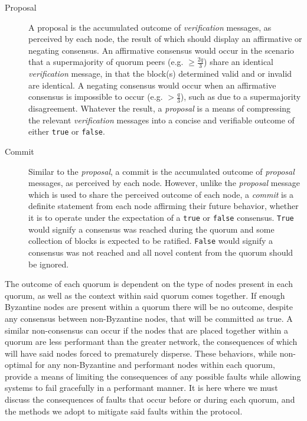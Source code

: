 \begin{description}
    \item[Proposal] A proposal is the accumulated outcome of \textit{verification} messages, as perceived by each node, the result of which should display an affirmative or negating consensus. An affirmative consensus would occur in the scenario that a supermajority of quorum peers (e.g. \(\ge \frac{2q}{3}\)) share an identical \textit{verification} message, in that the block(s) determined valid and or invalid are identical. A negating consensus would occur when an affirmative consensus is impossible  to occur (e.g. \(> \frac{q}{3}\)), such as due to a supermajority disagreement. Whatever the result, a \textit{proposal} is a means of compressing the relevant \textit{verification} messages into a concise and verifiable outcome of either \texttt{true} or \texttt{false}.

    \item[Commit] Similar to the \textit{proposal}, a commit is the accumulated outcome of \textit{proposal} messages, as perceived by each node. However, unlike the \textit{proposal} message which is used to share the perceived outcome of each node, a \textit{commit} is a definite statement from each node affirming their future behavior, whether it is to operate under the expectation of a \texttt{true} or \texttt{false} consensus. \texttt{True} would signify a consensus was reached during the quorum and some collection of blocks is expected to be ratified. \texttt{False} would signify a consensus was not reached and all novel content from the quorum should be ignored.
\end{description}

The outcome of each quorum is dependent on the type of nodes present in each quorum, as well as the context within said quorum comes together. If enough Byzantine nodes are present within a quorum there will be no outcome, despite any consensus between non-Byzantine nodes, that will be committed as true. A similar non-consensus can occur if the nodes that are placed together within a quorum are less performant than the greater network, the consequences of which will have said nodes forced to prematurely disperse. These behaviors, while non-optimal for any non-Byzantine and performant nodes within each quorum, provide a means of limiting the consequences of any possible faults while allowing systems to fail gracefully in a performant manner. It is here where we must discuss the consequences of faults that occur before or during each quorum, and the methods we adopt to mitigate said faults within the protocol.

